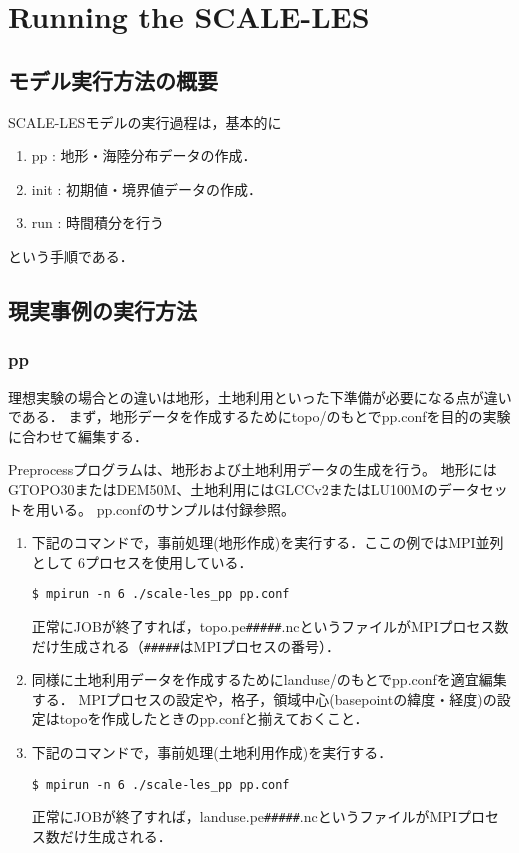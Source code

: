 \section{Running the SCALE-LES}

\subsection{モデル実行方法の概要}
SCALE-LESモデルの実行過程は，基本的に
\begin{enumerate}
\item pp : 地形・海陸分布データの作成．
\item init : 初期値・境界値データの作成．
\item run : 時間積分を行う
\end{enumerate}
という手順である．


\subsection{現実事例の実行方法}

\subsubsection{pp}
理想実験の場合との違いは地形，土地利用といった下準備が必要になる点が違いである．
まず，地形データを作成するためにtopo/のもとでpp.confを目的の実験に合わせて編集する．

Preprocessプログラムは、地形および土地利用データの生成を行う。
地形にはGTOPO30またはDEM50M、土地利用にはGLCCv2またはLU100Mのデータセットを用いる。
pp.confのサンプルは付録参照。


\begin{enumerate}
\item 下記のコマンドで，事前処理(地形作成)を実行する．ここの例ではMPI並列として
6プロセスを使用している．
\begin{verbatim}
$ mpirun -n 6 ./scale-les_pp pp.conf
\end{verbatim}
正常にJOBが終了すれば，topo.pe\verb|#####|.ncというファイルがMPIプロセス数だけ生成される（\verb|#####|はMPIプロセスの番号）．

\item 同様に土地利用データを作成するためにlanduse/のもとでpp.confを適宜編集する．
MPIプロセスの設定や，格子，領域中心(basepointの緯度・経度)の設定はtopoを作成したときのpp.confと揃えておくこと．

\item 下記のコマンドで，事前処理(土地利用作成)を実行する．
\begin{verbatim}
$ mpirun -n 6 ./scale-les_pp pp.conf
\end{verbatim}
正常にJOBが終了すれば，landuse.pe\verb|#####|.ncというファイルがMPIプロセス数だけ生成される．
\end{enumerate}


